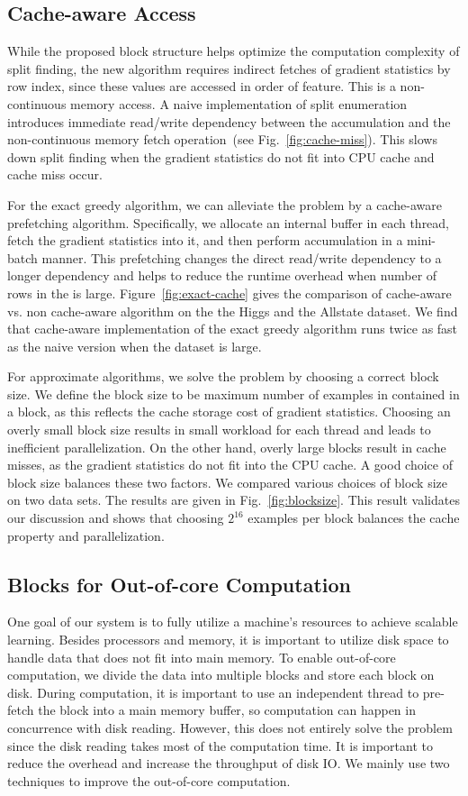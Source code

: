 \subsection{Cache-aware Access}

While the proposed block structure helps optimize the computation complexity of split finding, the new algorithm requires indirect fetches of gradient statistics by row index, since these values are accessed in order of feature. This is a non-continuous memory access. A naive implementation of split enumeration introduces immediate read/write dependency between the accumulation and the non-continuous memory fetch operation~(see Fig.~\ref{fig:cache-miss}).
This slows down split finding when the gradient statistics do not fit into CPU cache and cache miss occur.

For the exact greedy algorithm, we can alleviate the problem by a cache-aware prefetching algorithm. Specifically, we allocate an internal buffer in each thread, fetch the gradient statistics into it, and then perform accumulation in a mini-batch manner. This prefetching changes the direct read/write dependency to a longer dependency and helps to reduce the runtime overhead when number of rows in the is large.
Figure~\ref{fig:exact-cache} gives the comparison of cache-aware vs. non cache-aware algorithm on the the Higgs and the Allstate dataset. We find that cache-aware implementation of the exact greedy algorithm runs twice as fast as the naive version when the dataset is large.

For approximate algorithms, we solve the problem by choosing a correct block size. We define the block size to be maximum number of examples in contained in a block, as this reflects the cache storage cost of gradient statistics. Choosing an overly small block size results in small workload for each thread and leads to inefficient parallelization. On the other hand, overly large blocks result in cache misses, as the gradient statistics do not fit into the CPU cache. A good choice of block size balances these two factors. We compared various choices of block size on two data sets. The results are given in Fig.~\ref{fig:blocksize}.
This result validates our discussion and shows that choosing $2^{16}$ examples per block balances the cache property and parallelization.

\subsection{Blocks for Out-of-core Computation} One goal of our system is to fully utilize a machine's resources to achieve scalable learning. Besides processors and memory, it is important to utilize disk space to handle data that does not fit into main memory. To enable out-of-core computation, we divide the data into multiple blocks and store each block on disk. During computation, it is important to use an independent thread to pre-fetch the block into a main memory buffer, so computation can happen in concurrence with disk reading. However, this does not entirely solve the problem since the disk reading takes most of the computation time. It is important to reduce the overhead and increase the throughput of disk IO. We mainly use two techniques to improve the out-of-core computation.


